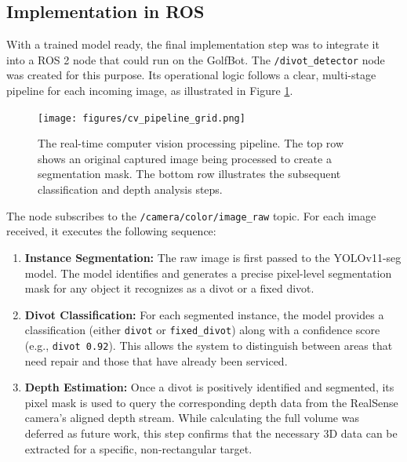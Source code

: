 \subsection{Implementation in ROS}
\label{ssec:cv_ros_implementation}
With a trained model ready, the final implementation step was to integrate it into a ROS 2 node that could run on the GolfBot. The \texttt{/divot\_detector} node was created for this purpose. Its operational logic follows a clear, multi-stage pipeline for each incoming image, as illustrated in Figure \ref{fig:cv_processing_pipeline}.

\begin{figure}[h!]
    \centering
    \texttt{[image: figures/cv\_pipeline\_grid.png]}
    \caption[The real-time computer vision processing pipeline.]%
    {The real-time computer vision processing pipeline. The top row shows an original captured image being processed to create a segmentation mask. The bottom row illustrates the subsequent classification and depth analysis steps.}
    \label{fig:cv_processing_pipeline}
\end{figure}

The node subscribes to the \texttt{/camera/color/image\_raw} topic. For each image received, it executes the following sequence:

\begin{enumerate}
    \item \textbf{Instance Segmentation:} The raw image is first passed to the YOLOv11-seg model. The model identifies and generates a precise pixel-level segmentation mask for any object it recognizes as a divot or a fixed divot.

    \item \textbf{Divot Classification:} For each segmented instance, the model provides a classification (either \texttt{divot} or \texttt{fixed\_divot}) along with a confidence score (e.g., \texttt{divot 0.92}). This allows the system to distinguish between areas that need repair and those that have already been serviced.

    \item \textbf{Depth Estimation:} Once a divot is positively identified and segmented, its pixel mask is used to query the corresponding depth data from the RealSense camera's aligned depth stream. While calculating the full volume was deferred as future work, this step confirms that the necessary 3D data can be extracted for a specific, non-rectangular target.
\end{enumerate}

